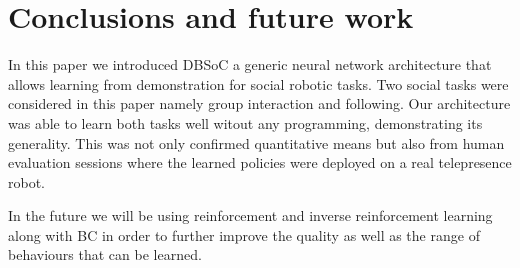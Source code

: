 \documentclass[letterpaper, 10 pt, conference]{ieeeconf}
\begin{document}
\section{Conclusions and future work} 

In this paper we introduced DBSoC a generic neural network architecture that allows learning from demonstration for social robotic tasks. Two social tasks were considered in this paper namely group interaction and following. Our architecture was able to learn both tasks well witout any programming, demonstrating its generality. This was not only confirmed quantitative means but also from human evaluation sessions where the learned policies were deployed on a real telepresence robot. 

In the future we will be using reinforcement and inverse reinforcement learning along with BC in order to further improve the quality as well as the range of behaviours that can be learned.   



\end{document}
